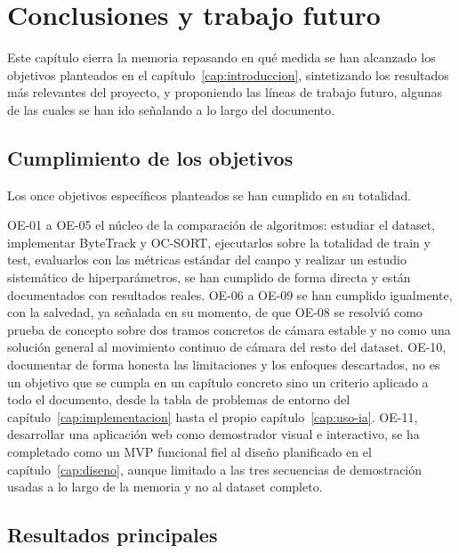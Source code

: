 \chapter{Conclusiones y trabajo futuro}\label{cap:conclusiones}

Este capítulo cierra la memoria repasando en qué medida se han alcanzado
los objetivos planteados en el capítulo~\ref{cap:introduccion}, sintetizando
los resultados más relevantes del proyecto, y proponiendo las líneas de
trabajo futuro, algunas de las cuales se han ido señalando a lo largo del documento.

\section{Cumplimiento de los objetivos}
\label{sec:conclusiones-objetivos}

Los once objetivos específicos planteados se han cumplido en su totalidad.

OE-01 a OE-05 el núcleo de la comparación de algoritmos: estudiar el
dataset, implementar ByteTrack y OC-SORT, ejecutarlos sobre la totalidad de
train y test, evaluarlos con las métricas estándar del campo y realizar un
estudio sistemático de hiperparámetros, se han cumplido de forma directa
y están documentados con resultados reales. OE-06 a OE-09
se han cumplido igualmente, con la salvedad, ya señalada en su
momento, de que OE-08 se resolvió como prueba de concepto sobre dos tramos
concretos de cámara estable y no como una solución general al movimiento
continuo de cámara del resto del dataset.
OE-10, documentar de forma
honesta las limitaciones y los enfoques descartados, no es un objetivo que
se cumpla en un capítulo concreto sino un criterio aplicado a todo el documento,
desde la tabla de problemas de entorno del
capítulo~\ref{cap:implementacion} hasta el propio capítulo~\ref{cap:uso-ia}.
OE-11, desarrollar una aplicación web como demostrador visual e
interactivo, se ha completado como un MVP funcional
fiel al diseño planificado en el
capítulo~\ref{cap:diseno}, aunque limitado a las tres secuencias de
demostración usadas a lo largo de la memoria y no al dataset completo.

\section{Resultados principales}
\label{sec:conclusiones-resultados}

